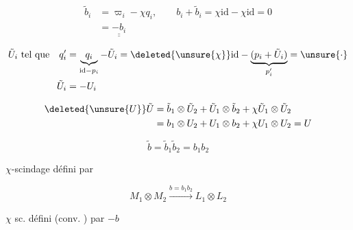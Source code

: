 
\[
 \begin{aligned}
 \tilde b_i&=\varpi_i-\chi q_i,\qquad b_i+\tilde b_i=\chi\mathrm{id}-\chi\mathrm{id}=0\\
 &=\underline{\underline{-b_i}}
 \end{aligned}
\]

\[
 \begin{aligned}
 \tilde U_i\ \text{tel que}\quad q'_i&=\underbrace{q_i}_{\mathrm{id}-p_i}-\tilde U_i
 =\deleted{\unsure{\chi}}\mathrm{id}-\underbrace{(p_i+\tilde U_i)}_{p'_i}=\unsure{\cdot}\\
 \tilde U_i&=-U_i
 \end{aligned}
\]

\[
 \begin{aligned}
 \deleted{\unsure{U}}\tilde U&=\tilde b_1\otimes\tilde U_2+\tilde U_1\otimes\tilde b_2+\chi\tilde U_1\otimes\tilde U_2\\
 &=b_1\otimes U_2+U_1\otimes b_2+\chi U_1\otimes U_2=U
 \end{aligned}
\]


\[
 \tilde b=\tilde b_1\tilde b_2=b_1b_2
\]


$\chi$-scindage défini  par

\[
 M_1\otimes M_2\xrightarrow{b=b_1b_2}L_1\otimes L_2
\]

$\chi$ sc. défini (conv. ) par $-b$

